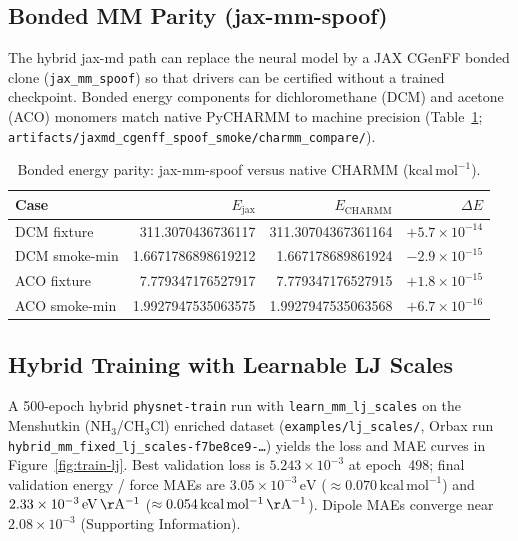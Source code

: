 \documentclass[journal=jctc,manuscript=article]{achemso}
\begin{document}
\subsection{Bonded MM Parity (jax-mm-spoof)}

The hybrid jax-md path can replace the neural model by a JAX CGenFF bonded
clone (\texttt{jax\_mm\_spoof}) so that drivers can be certified without a
trained checkpoint. Bonded energy components for dichloromethane (DCM) and
acetone (ACO) monomers match native PyCHARMM to machine precision
(Table~\ref{tab:spoof}; \texttt{artifacts/jaxmd\_cgenff\_spoof\_smoke/charmm\_compare/}).

\begin{table}[h]
\caption{Bonded energy parity: jax-mm-spoof versus native CHARMM
(\(\mathrm{kcal\,mol^{-1}}\)).}
\label{tab:spoof}
\begin{tabular}{lrrr}
\toprule
Case & \(E_{\mathrm{jax}}\) & \(E_{\mathrm{CHARMM}}\) & \(\Delta E\) \\
\midrule
DCM fixture & 311.3070436736117 & 311.30704367361164 & \(+5.7\times10^{-14}\) \\
DCM smoke-min & 1.6671786898619212 & 1.667178689861924 & \(-2.9\times10^{-15}\) \\
ACO fixture & 7.779347176527917 & 7.779347176527915 & \(+1.8\times10^{-15}\) \\
ACO smoke-min & 1.9927947535063575 & 1.9927947535063568 & \(+6.7\times10^{-16}\) \\
\bottomrule
\end{tabular}
\end{table}

\subsection{Hybrid Training with Learnable LJ Scales}

A 500-epoch hybrid \texttt{physnet-train} run with
\texttt{learn\_mm\_lj\_scales} on the Menshutkin (NH\(_3\)/CH\(_3\)Cl) enriched
dataset (\texttt{examples/lj\_scales/}, Orbax run
\texttt{hybrid\_mm\_fixed\_lj\_scales-f7be8ce9-\ldots}) yields the loss and MAE
curves in Figure~\ref{fig:train-lj}. Best validation loss is
\(5.243\times10^{-3}\) at epoch~498; final validation energy / force MAEs are
\(3.05\times10^{-3}\,\mathrm{eV}\) (\(\approx 0.070\,\mathrm{kcal\,mol^{-1}}\))
and \(2.33\times10^{-3}\,\mathrm{eV\,\AA^{-1}}\)
(\(\approx 0.054\,\mathrm{kcal\,mol^{-1}\,\AA^{-1}}\)). Dipole MAEs converge
near \(2.08\times10^{-3}\) (Supporting Information).
\end{document}
